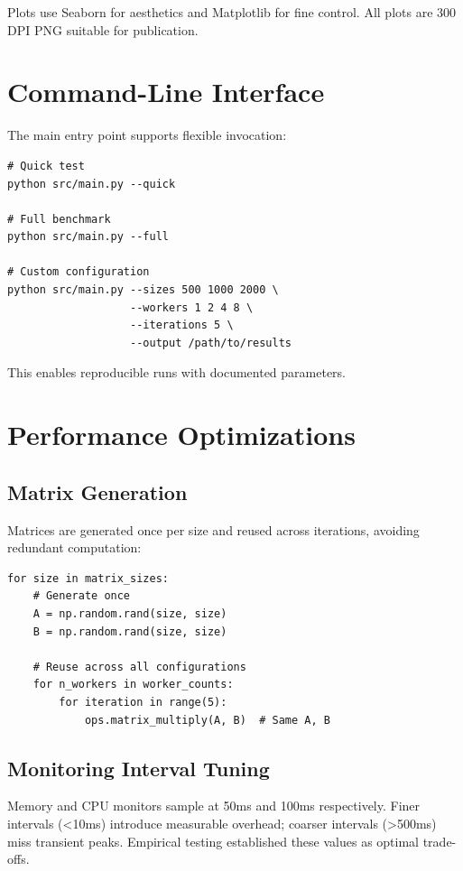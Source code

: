 Plots use Seaborn for aesthetics and Matplotlib for fine control. All plots are 300 DPI PNG suitable for publication.

\section{Command-Line Interface}

The main entry point supports flexible invocation:

\begin{verbatim}
# Quick test
python src/main.py --quick

# Full benchmark
python src/main.py --full

# Custom configuration
python src/main.py --sizes 500 1000 2000 \
                   --workers 1 2 4 8 \
                   --iterations 5 \
                   --output /path/to/results
\end{verbatim}

This enables reproducible runs with documented parameters.

\section{Performance Optimizations}

\subsection{Matrix Generation}

Matrices are generated once per size and reused across iterations, avoiding redundant computation:

\begin{verbatim}
for size in matrix_sizes:
    # Generate once
    A = np.random.rand(size, size)
    B = np.random.rand(size, size)
    
    # Reuse across all configurations
    for n_workers in worker_counts:
        for iteration in range(5):
            ops.matrix_multiply(A, B)  # Same A, B
\end{verbatim}

\subsection{Monitoring Interval Tuning}

Memory and CPU monitors sample at 50ms and 100ms respectively. Finer intervals (<10ms) introduce measurable overhead; coarser intervals (>500ms) miss transient peaks. Empirical testing established these values as optimal trade-offs.

